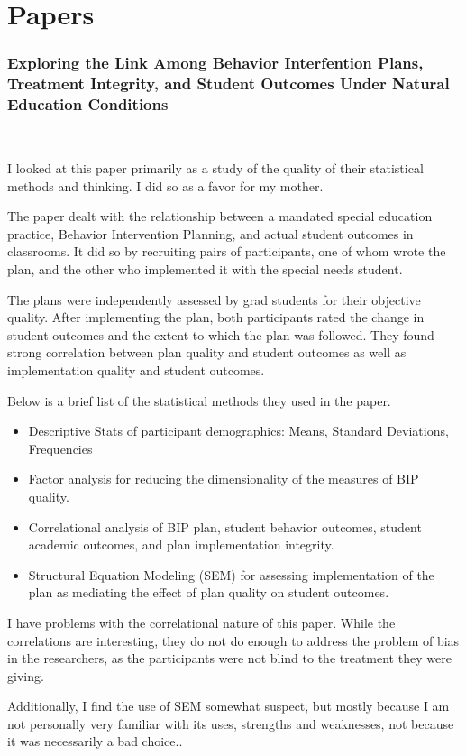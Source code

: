 \documentclass[12pt]{article}
\newenvironment{annotatedcitation}[2]%
{\bigskip \subsubsection*{#1}  \fullcite{#2} \\ \smallskip \noindent}%
{\bigskip}
\begin{document}
\section{Papers}

  \begin{annotatedcitation}{Exploring the Link Among Behavior Interfention Plans, Treatment Integrity,
                            and Student Outcomes Under Natural Education Conditions}{cook12}

    I looked at this paper primarily as a study of the quality of
    their statistical methods and thinking. I did so as a favor for my
    mother.

    The paper dealt with the relationship between a mandated special
    education practice, Behavior Intervention Planning, and actual
    student outcomes in classrooms. It did so by recruiting pairs of
    participants, one of whom wrote the plan, and the other who
    implemented it with the special needs student.

    The plans were independently assessed by grad students for their
    objective quality. After implementing the plan, both participants
    rated the change in student outcomes and the extent to which the
    plan was followed. They found strong correlation between plan
    quality and student outcomes as well as implementation quality and
    student outcomes.

    Below is a brief list of the statistical methods they used in the
    paper.

    \begin{itemize}
      \item Descriptive Stats of participant demographics: Means,
        Standard Deviations, Frequencies
      \item Factor analysis for reducing the dimensionality of the
        measures of BIP quality.
      \item Correlational analysis of BIP plan, student behavior
        outcomes, student academic outcomes, and plan implementation
        integrity.
      \item Structural Equation Modeling (SEM) for assessing
        implementation of the plan as mediating the effect of plan
        quality on student outcomes.
    \end{itemize}

    I have problems with the correlational nature of this paper. While
    the correlations are interesting, they do not do enough to address
    the problem of bias in the researchers, as the participants were
    not blind to the treatment they were giving.

    Additionally, I find the use of SEM somewhat suspect, but mostly
    because I am not personally very familiar with its uses, strengths
    and weaknesses, not because it was necessarily a bad choice..

  \end{annotatedcitation}
\end{document}

